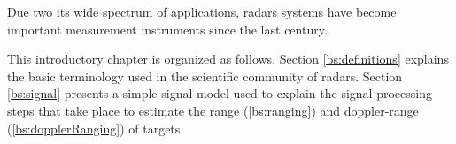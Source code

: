 Due two its wide spectrum of applications, radars systems have become important measurement instruments since the last century. 

This introductory chapter is organized as follows. Section \ref{bs:definitions} explains the basic terminology used in the scientific community of radars. Section \ref{bs:signal} presents a simple signal model used to explain the signal processing steps that take place to estimate the range (\ref{bs:ranging}) and doppler-range (\ref{bs:dopplerRanging}) of targets